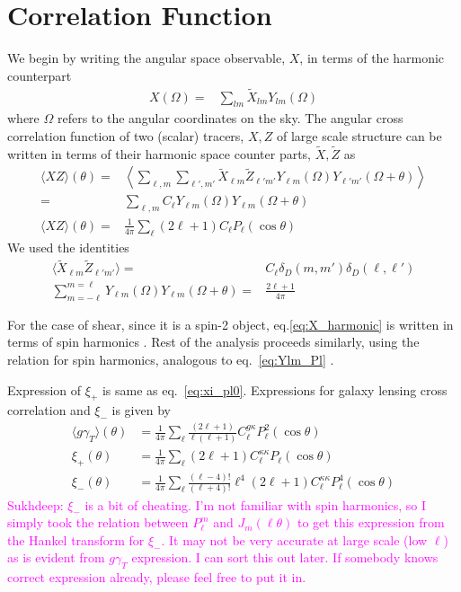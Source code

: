 \documentclass[]{article}
\newcommand{\sukhdeep}[1]{{\textcolor{magenta}{Sukhdeep: #1}}}
\begin{document}
\section{Correlation Function}
	We begin by writing the angular space observable, $X$, in terms of the harmonic counterpart 
	\begin{align}\label{eq:X_harmonic}
		X(\Omega)=&\sum_{lm}\tilde X_{lm}Y_{lm}(\Omega)
	\end{align}
	where $\Omega$ refers to the angular coordinates on the sky.
	The angular cross correlation function of two (scalar) tracers, $X,Z$ of large scale structure can be written in terms 
	of their harmonic space counter parts, $\tilde X, \tilde Z$ as
	\begin{align}
		\langle XZ \rangle(\theta)=&\left\langle\sum_{\ell,m}\sum_{\ell', m'}\tilde X_{\ell m}\tilde Z_{\ell' m'}
									Y_{\ell m}(\Omega)
									Y_{\ell'm'}(\Omega+\theta)\right\rangle\\
									=&\sum_{\ell,m}C_{\ell}Y_{\ell m}(\Omega)
									Y_{\ell m}(\Omega+\theta)\\
		\langle XZ \rangle(\theta)=&\frac{1}{4\pi}\sum_{\ell}(2\ell+1)C_{\ell}P_{\ell}(\cos\theta)\label{eq:xi_pl0}
	\end{align}
	We used the identities
	\begin{align}
		\langle\tilde X_{\ell m}\tilde Z_{\ell' m'}\rangle=&C_{\ell}\delta_D(m,m')\delta_D(\ell,\ell')\\
		\sum_{m=-\ell}^{m=\ell}Y_{\ell m}(\Omega)Y_{\ell m}(\Omega+\theta)=&\frac{2\ell+1}{4\pi}\label{eq:Ylm_Pl}
	\end{align}
	
	For the case of shear, since it is a spin-2 object, eq.\ref{eq:X_harmonic} is written in terms of spin harmonics 
	\citep[see for ex.][]{Castro2005,Kilbinger2017}. Rest of the analysis proceeds similarly, using the relation for spin 
	harmonics, 
	analogous to eq.~\ref{eq:Ylm_Pl} \citep[see for ex. ][]{Hu1997}. 
	
	Expression of $\xi_+$ is same as eq.~\ref{eq:xi_pl0}. Expressions for galaxy lensing cross correlation 
	\cite{Putter2010} and $\xi_-$ is given by
	\begin{align}
		\langle g\gamma_T\rangle(\theta)&=\frac{1}{4\pi}\sum_{\ell}\frac{(2\ell+1)}{\ell(\ell+1)}C_{\ell}^{g\kappa}
		P_{\ell}^2(\cos\theta)\label{eq:xi_g_gamma}\\
		\xi_+(\theta)&=\frac{1}{4\pi}\sum_{\ell}{(2\ell+1)}C_{\ell}^{\kappa\kappa}
		P_{\ell}(\cos\theta)\label{eq:xi_p}\\
		\xi_-(\theta)&=\frac{1}{4\pi}\sum_{\ell}\frac{(\ell-4)!}{(\ell+4)!}\ell^4{(2\ell+1)}C_{\ell}^{\kappa\kappa}
		P_{\ell}^4(\cos\theta)\label{eq:xi_m}
	\end{align}
\sukhdeep{$\xi_-$ is a bit of cheating. I'm not familiar with spin harmonics, so I simply took the relation between 
$P_\ell^m$ and $J_m(\ell \theta)$ to get this expression from the Hankel transform for $\xi_-$. It may not be very accurate at large scale (low $\ell$) as is evident from $g\gamma_T$ expression. I can sort this out later. If somebody knows correct expression already, please feel free to put it in.}
\end{document}
